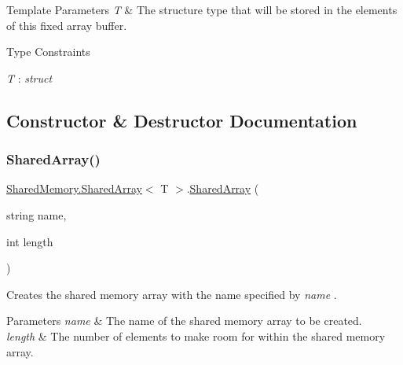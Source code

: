 \begin{DoxyTemplParams}{Template Parameters}
{\em T} & The structure type that will be stored in the elements of this fixed array buffer.\\
\hline
\end{DoxyTemplParams}
\begin{Desc}
\item[Type Constraints]\begin{description}
\item[{\em T} : {\em struct}]\end{description}
\end{Desc}


\subsection{Constructor \& Destructor Documentation}
\mbox{\label{class_shared_memory_1_1_shared_array_a040ca6a2363a476b8d70ede86470c527}} 
\subsubsection{\texorpdfstring{Shared\+Array()}{SharedArray()}\hspace{0.1cm}{\footnotesize\ttfamily [1/2]}}
{\footnotesize\ttfamily \hyperlink{class_shared_memory_1_1_shared_array}{Shared\+Memory.\+Shared\+Array}$<$ T $>$.\hyperlink{class_shared_memory_1_1_shared_array}{Shared\+Array} (\begin{DoxyParamCaption}\item[{string}]{name,  }\item[{int}]{length }\end{DoxyParamCaption})\hspace{0.3cm}{\ttfamily [inline]}}



Creates the shared memory array with the name specified by {\itshape name} . 


\begin{DoxyParams}{Parameters}
{\em name} & The name of the shared memory array to be created.\\
\hline
{\em length} & The number of elements to make room for within the shared memory array.\\
\hline
\end{DoxyParams}
\mbox{\label{class_shared_memory_1_1_shared_array_a37348ea74c68aa8b6ac66ac086a7dbe5}} 
